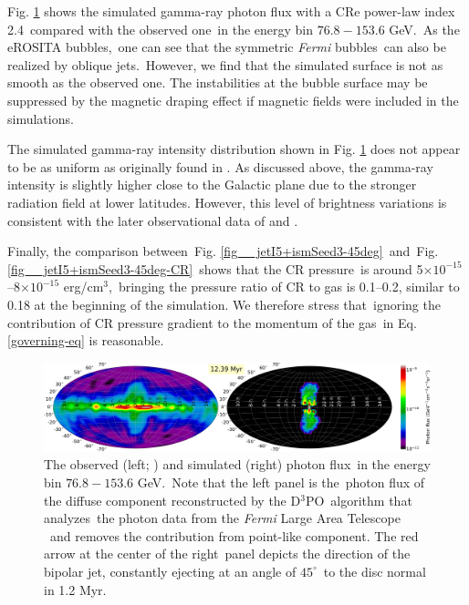 \documentclass[fleqn,usenatbib,useAMS]{mnras}
\begin{document}
 Fig. \ref{fig__gammaRay-map} shows the simulated gamma-ray photon flux with a CRe power-law index 2.4\
 compared with the observed one\
 in the energy bin $76.8-153.6$ GeV.\
 As the eROSITA bubbles,\
 one can see that the symmetric \textit{Fermi} bubbles\
 can also be realized by oblique jets.\
 However, we find that the simulated surface is not as smooth
 as the observed one. The instabilities at the bubble
 surface may be suppressed by the magnetic draping
 effect \citep{Lyutikov2006,Yang2012} if magnetic fields were
 included in the simulations.

 The simulated gamma-ray intensity
 distribution shown in Fig. \ref{fig__gammaRay-map} does not appear to be
 as uniform as originally found in \citet{Su2012}.
 As discussed above, the gamma-ray intensity is slightly
 higher close to the Galactic plane due to the stronger
 radiation field at lower latitudes. However, this level
 of brightness variations is consistent with the later
 observational data of \citet{Ackermann2014} and \citet{Selig2015}.

 Finally, the comparison between\
 Fig. \ref{fig__jetI5+ismSeed3-45deg}\
 and\
 Fig. \ref{fig__jetI5+ismSeed3-45deg-CR}\
 shows that the CR pressure\
 is around 5$\times10^{-15}$--8$\times10^{-15}$ erg/cm$^{3}$,\
 bringing the pressure ratio of CR to gas is 0.1--0.2,
 similar to 0.18 at the beginning of the simulation.
 We therefore stress that\
 ignoring the contribution of CR pressure gradient to the momentum of the gas\
 in Eq. \ref{governing-eq} is reasonable.




\begin{figure}
  \includegraphics[width=\linewidth]{figures/fig__GammaRay_100e9_1e6_angle_000.png}
  \caption{The observed (left; \citealt{Selig2015}) and simulated (right) photon flux\
           in the energy bin $76.8-153.6$ GeV.\
           Note that the left panel is the\
           photon flux of the diffuse component reconstructed by the D$^3$PO\
           algorithm \citep{Selig2015} that analyzes\
           the photon data from the \textit{Fermi} Large Area Telescope \citep{Atwood2009}\
           and removes the contribution from point-like component.
           The red arrow at the center of the right\
           panel depicts the direction of the bipolar jet, constantly ejecting at an angle of $45^{\circ}$\
           to the disc normal in 1.2 Myr.
  }
  \label{fig__gammaRay-map}
\end{figure}
\end{document}
